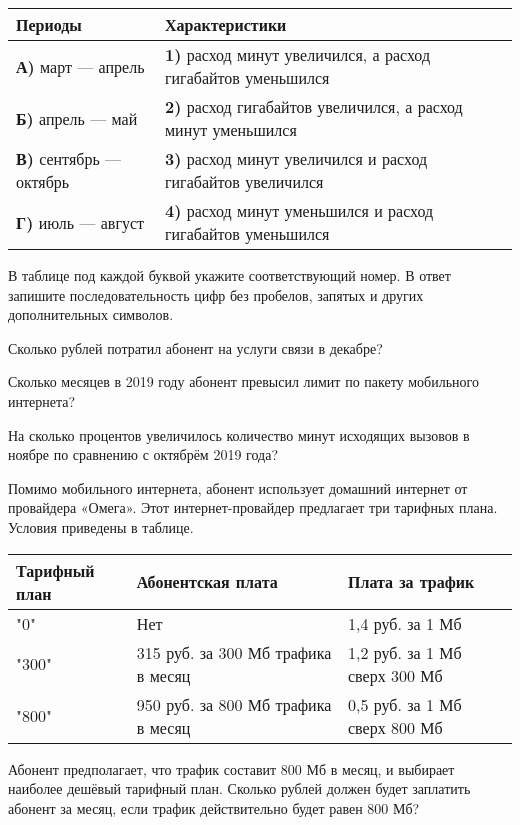 \begin{training}[2]
\begin{listofex}
\begin{center}
\begin{tabular}{ |p{1.7in}|p{2.8in}| }
				\hline
				\textbf{Периоды} & \textbf{Характеристики} \\ 
				\hline
				\textbf{А)} март --- апрель & \textbf{1)} расход минут увеличился, а расход
				гигабайтов уменьшился\\
				\hline
				\textbf{Б)} апрель --- май & \textbf{2)} расход гигабайтов увеличился, а
				расход минут уменьшился\\
				\hline
				\textbf{В)} сентябрь --- октябрь & \textbf{3)} расход минут увеличился и расход гигабайтов увеличился
\\
				\hline
				\textbf{Г)} июль --- август & \textbf{4)} расход минут уменьшился и расход гигабайтов уменьшился\\
				\hline
			\end{tabular}
		\end{center}
		В таблице под каждой буквой укажите соответствующий номер. В ответ запишите последовательность цифр без пробелов, запятых и других дополнительных символов.
		\foranswer
		\item Сколько рублей потратил абонент на услуги связи в декабре? 
		\foranswer
		\item Сколько месяцев в 2019 году абонент превысил лимит по пакету мобильного интернета? 
		\foranswer
		\item На сколько процентов увеличилось количество минут исходящих вызовов в ноябре по сравнению с октябрём 2019 года?
		\foranswer
		\item Помимо мобильного интернета, абонент использует домашний интернет от провайдера «Омега». Этот интернет-провайдер предлагает три тарифных плана. Условия приведены в таблице.
	\begin{center}
		\begin{tabular}{ |p{1in}|p{1.6in}|p{1.6in}| }
			\hline
			Тарифный план & Абонентская плата & Плата за трафик \\ 
			\hline
			"0" & Нет & 1,4 руб. за 1 Мб \\
			\hline
			"300" & 315 руб. за 300 Мб трафика в месяц & 1,2 руб. за 1 Мб сверх 300 Мб \\
			\hline
			"800" & 950 руб. за 800 Мб трафика в месяц & 0,5 руб. за 1 Мб сверх 800 Мб \\
			\hline
		\end{tabular}
	\end{center}
	Абонент предполагает, что трафик составит 800 Мб в месяц, и выбирает наиболее дешёвый тарифный план. Сколько рублей должен будет заплатить абонент за месяц, если трафик действительно будет равен 800 Мб?

\end{listofex}
\end{training}
